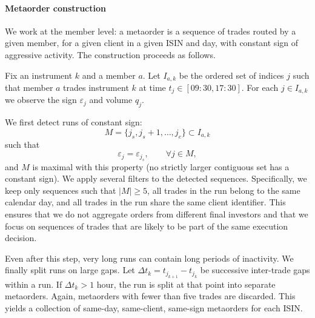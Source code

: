 \documentclass[11pt]{article}
\begin{document}
\paragraph{Metaorder construction} We work at the member level: a metaorder is a sequence of
trades routed by a given member, for a given client in a given ISIN and day, with constant sign of
aggressive activity. The construction proceeds as follows.

Fix an instrument $k$ and a member $a$. Let $I_{a,k}$ be the ordered set
of indices $j$ such that member $a$ trades instrument $k$ at time
$t_j \in [09{:}30,17{:}30]$. For each $j \in I_{a,k}$ we observe the
sign $\varepsilon_j$ and volume $q_j$.

We first detect runs of constant sign:
\begin{equation}
  M = \{j_s, j_s+1, \dots, j_e\} \subset I_{a,k}
\end{equation}
such that
\begin{equation}
  \varepsilon_j = \varepsilon_{j_s}, \qquad \forall j \in M,
\end{equation}
and $M$ is maximal with this property (no strictly larger contiguous
set has a constant sign). We apply several filters to the detected sequences. Specifically, we keep only sequences such that
$|M| \geq 5$, all trades in the run belong to the same calendar day, and all trades in the run share the same client identifier. 
This ensures that we do not aggregate orders from different final investors and that we focus on sequences of trades that are likely to be part of the same execution decision.


Even after this step, very long runs can contain long periods of
inactivity. We finally split runs on large gaps. Let $\Delta t_k = t_{j_{k+1}} - t_{j_k}$ be
successive inter-trade gaps within a run. If $\Delta t_k > 1 \text{ hour}$,
the run is split at that point into separate metaorders. Again, 
metaorders with fewer than five trades are discarded. This yields a collection of same-day, same-client, same-sign metaorders for each ISIN.
\end{document}

